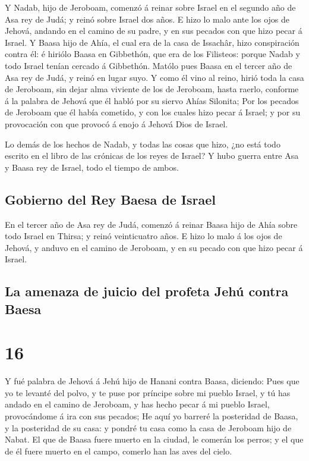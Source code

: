  Y Nadab, hijo de Jeroboam, comenzó á reinar sobre Israel
en el segundo año de Asa rey de Judá; y reinó sobre Israel dos años.
 E hizo lo malo ante los ojos de Jehová, andando en el
camino de su padre, y en sus pecados con que hizo pecar á Israel.
 Y Baasa hijo de Ahía, el cual era de la casa de Issachâr,
hizo conspiración contra él: é hiriólo Baasa en Gibbethón, que era de
los Filisteos: porque Nadab y todo Israel tenían cercado á Gibbethón.
 Matólo pues Baasa en el tercer año de Asa rey de Judá, y
reinó en lugar suyo.  Y como él vino al reino, hirió toda
la casa de Jeroboam, sin dejar alma viviente de los de Jeroboam, hasta
raerlo, conforme á la palabra de Jehová que él habló por su siervo Ahías
Silonita;  Por los pecados de Jeroboam que él había
cometido, y con los cuales hizo pecar á Israel; y por su provocación con
que provocó á enojo á Jehová Dios de Israel.

 Lo demás de los hechos de Nadab, y todas las cosas que
hizo, ¿no está todo escrito en el libro de las crónicas de los reyes de
Israel?  Y hubo guerra entre Asa y Baasa rey de Israel,
todo el tiempo de ambos.

\hypertarget{gobierno-del-rey-baesa-de-israel}{%
\subsection{Gobierno del Rey Baesa de
Israel}\label{gobierno-del-rey-baesa-de-israel}}

 En el tercer año de Asa rey de Judá, comenzó á reinar
Baasa hijo de Ahía sobre todo Israel en Thirsa; y reinó veinticuatro
años.  E hizo lo malo á los ojos de Jehová, y anduvo en el
camino de Jeroboam, y en su pecado con que hizo pecar á Israel.

\hypertarget{la-amenaza-de-juicio-del-profeta-jehuxfa-contra-baesa}{%
\subsection{La amenaza de juicio del profeta Jehú contra
Baesa}\label{la-amenaza-de-juicio-del-profeta-jehuxfa-contra-baesa}}

\hypertarget{section-15}{%
\section{16}\label{section-15}}

 Y fué palabra de Jehová á Jehú hijo de Hanani contra Baasa,
diciendo:  Pues que yo te levanté del polvo, y te puse por
príncipe sobre mi pueblo Israel, y tú has andado en el camino de
Jeroboam, y has hecho pecar á mi pueblo Israel, provocándome á ira con
sus pecados;  He aquí yo barreré la posteridad de Baasa, y
la posteridad de su casa: y pondré tu casa como la casa de Jeroboam hijo
de Nabat.  El que de Baasa fuere muerto en la ciudad, le
comerán los perros; y el que de él fuere muerto en el campo, comerlo han
las aves del cielo.


